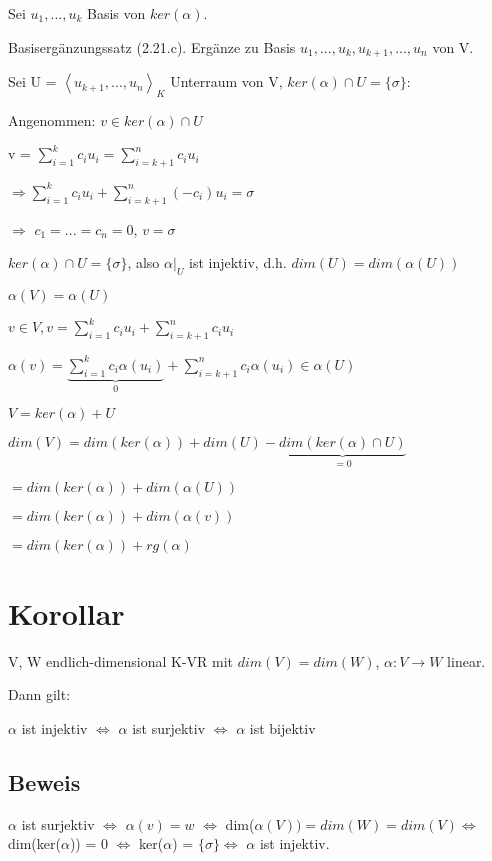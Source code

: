 \documentclass[a4paper, openany]{book}
\begin{document}
        Sei $u_1, ..., u_k$ Basis von $ker(\alpha)$.

        Basisergänzungssatz (2.21.c). Ergänze zu Basis $u_1, ..., u_k, u_{k+1}, ..., u_n$ von V.

        Sei U = $\left \langle u_{k+1}, ..., u_n \right\rangle_K$ Unterraum von V, $ker(\alpha) \cap U = \{\sigma\}$:

        Angenommen: $v \in ker(\alpha) \cap U$

        v = $\sum_{i=1}^k c_i u_i = \sum_{i=k+1}^n c_i u_i$

        $\Rightarrow \sum_{i=1}^k c_i u_i + \sum_{i=k+1}^n (-c_i)u_i = \sigma$

        $\Rightarrow$ $c_1 = ... = c_n = 0$, $v = \sigma$

        $ker(\alpha) \cap U = \{\sigma\}$, also $\alpha|_{U}$ ist injektiv, d.h. $dim(U) = dim(\alpha(U))$

        $\alpha(V) = \alpha(U)$

        $v \in V, v = \sum_{i=1}^k c_i u_i + \sum_{i=k+1}^n c_i u_i$

        $\alpha(v) = \underbrace{\sum_{i=1}^k c_i \alpha(u_i)}_{0} + \sum_{i=k+1}^n c_i \alpha(u_i) \in \alpha(U)$

        $V = ker(\alpha) + U$

        $dim(V) = dim(ker(\alpha)) + dim(U) - \underbrace{dim(ker(\alpha) \cap U)}_{=0}$

        $= dim(ker(\alpha)) + dim(\alpha(U))$

        $= dim(ker(\alpha)) + dim(\alpha(v))$

        $= dim(ker(\alpha)) + rg(\alpha)$

        \section{Korollar}

        V, W endlich-dimensional K-VR mit \underline{$dim(V) = dim(W)$}, $\alpha: V \rightarrow W$ linear. 

        Dann gilt:

        $\alpha$ ist injektiv $\Leftrightarrow$ $\alpha$ ist surjektiv $\Leftrightarrow$ $\alpha$ ist bijektiv

        \subsection{Beweis}

        $\alpha$ ist surjektiv $\Leftrightarrow$ $\alpha(v) = w$ $\Leftrightarrow$ dim($\alpha(V)) = dim(W) = dim(V) \Leftrightarrow$ dim(ker($\alpha$)) = 0 $\Leftrightarrow$ ker($\alpha$) = $\{\sigma\} \Leftrightarrow$ $\alpha$ ist injektiv.
\end{document}
